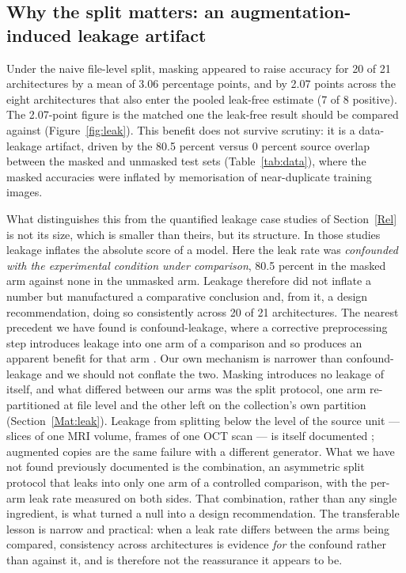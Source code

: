 \documentclass{melba}
\begin{document}
\subsection{Why the split matters: an augmentation-induced leakage artifact}
\label{Res:leak}
Under the naive file-level split, masking appeared to raise accuracy for 20 of 21 architectures by a mean of 3.06 percentage points, and by 2.07 points across the eight architectures that also enter the pooled leak-free estimate (7 of 8 positive). The 2.07-point figure is the matched one the leak-free result should be compared against (Figure~\ref{fig:leak}). This benefit does not survive scrutiny: it is a data-leakage artifact, driven by the 80.5 percent versus 0 percent source overlap between the masked and unmasked test sets (Table~\ref{tab:data}), where the masked accuracies were inflated by memorisation of near-duplicate training images.

What distinguishes this from the quantified leakage case studies of Section~\ref{Rel} is not its size, which is smaller than theirs, but its structure. In those studies leakage inflates the absolute score of a model. Here the leak rate was \emph{confounded with the experimental condition under comparison}, 80.5 percent in the masked arm against none in the unmasked arm. Leakage therefore did not inflate a number but manufactured a comparative conclusion and, from it, a design recommendation, doing so consistently across 20 of 21 architectures. The nearest precedent we have found is confound-leakage, where a corrective preprocessing step introduces leakage into one arm of a comparison and so produces an apparent benefit for that arm \citep{hamdan2023}. Our own mechanism is narrower than confound-leakage and we should not conflate the two. Masking introduces no leakage of itself, and what differed between our arms was the split protocol, one arm re-partitioned at file level and the other left on the collection's own partition (Section~\ref{Mat:leak}). Leakage from splitting below the level of the source unit --- slices of one MRI volume, frames of one OCT scan --- is itself documented \citep{yagis2021,tampu2022}; augmented copies are the same failure with a different generator. What we have not found previously documented is the combination, an asymmetric split protocol that leaks into only one arm of a controlled comparison, with the per-arm leak rate measured on both sides. That combination, rather than any single ingredient, is what turned a null into a design recommendation. The transferable lesson is narrow and practical: when a leak rate differs between the arms being compared, consistency across architectures is evidence \emph{for} the confound rather than against it, and is therefore not the reassurance it appears to be.
\end{document}
